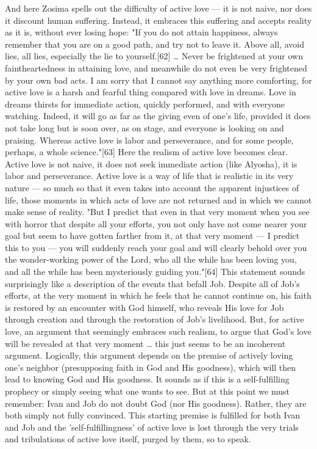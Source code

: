 And here Zosima spells out the difficulty of active love — it is not naive, nor does it discount human suffering. Instead, it embraces this suffering and accepts reality as it is, without ever losing hope: 
"If you do not attain happiness, always remember that you are on a good path, and try not to leave it. Above all, avoid lies, all lies, especially the lie to yourself.[62] … Never be frightened at your own faintheartedness in attaining love, and meanwhile do not even be very frightened by your own bad acts. I am sorry that I cannot say anything more comforting, for active love is a harsh and fearful thing compared with love in dreams. Love in dreams thirsts for immediate action, quickly performed, and with everyone watching. Indeed, it will go as far as the giving even of one's life, provided it does not take long but is soon over, as on stage, and everyone is looking on and praising. Whereas active love is labor and perseverance, and for some people, perhaps, a whole science."[63] 
Here the realism of active love becomes clear. Active love is not naive, it does not seek immediate action (like Alyosha), it is labor and perseverance. Active love is a way of life that is realistic in its very nature — so much so that it even takes into account the apparent injustices of life, those moments in which acts of love are not returned and in which we cannot make sense of reality. 
"But I predict that even in that very moment when you see with horror that despite all your efforts, you not only have not come nearer your goal but seem to have gotten farther from it, at that very moment — I predict this to you — you will suddenly reach your goal and will clearly behold over you the wonder-working power of the Lord, who all the while has been loving you, and all the while has been mysteriously guiding you."[64]
This statement sounds surprisingly like a description of the events that befall Job. Despite all of Job's efforts, at the very moment in which he feels that he cannot continue on, his faith is restored by an encounter with God himself, who reveals His love for Job through creation and through the restoration of Job's livelihood. But, for active love, an argument that seemingly embraces such realism, to argue that God's love will be revealed at that very moment … this just seems to be an incoherent argument. Logically, this argument depends on the premise of actively loving one's neighbor (presupposing faith in God and His goodness), which will then lead to knowing God and His goodness. It sounds as if this is a self-fulfilling prophecy or simply seeing what one wants to see. But at this point we must remember: Ivan and Job do not doubt God (nor His goodness). Rather, they are both simply not fully convinced. This starting premise is fulfilled for both Ivan and Job and the 'self-fulfillingness' of active love is lost through the very trials and tribulations of active love itself, purged by them, so to speak.
